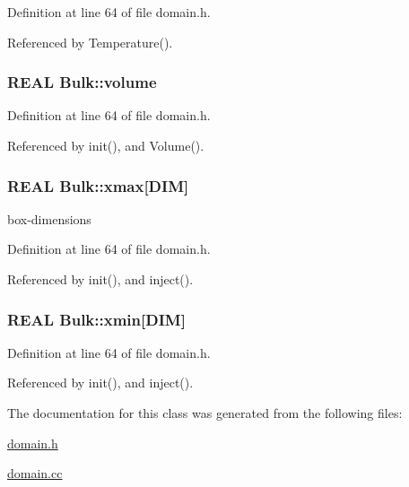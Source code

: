 Definition at line 64 of file domain.h.

Referenced by Temperature().\hypertarget{classBulk_9ffe7d1a5699e06ab7d59245f7bddcd4}{
\subsubsection[{volume}]{\setlength{\rightskip}{0pt plus 5cm}REAL {\bf Bulk::volume}}}
\label{classBulk_9ffe7d1a5699e06ab7d59245f7bddcd4}




Definition at line 64 of file domain.h.

Referenced by init(), and Volume().\hypertarget{classBulk_3297dbcf83d7c66815a5c713ebf1bfd4}{
\subsubsection[{xmax}]{\setlength{\rightskip}{0pt plus 5cm}REAL {\bf Bulk::xmax}\mbox{[}DIM\mbox{]}}}
\label{classBulk_3297dbcf83d7c66815a5c713ebf1bfd4}


box-dimensions 



Definition at line 64 of file domain.h.

Referenced by init(), and inject().\hypertarget{classBulk_5dadbb8571e0fef63e38bcc26c47637e}{
\subsubsection[{xmin}]{\setlength{\rightskip}{0pt plus 5cm}REAL {\bf Bulk::xmin}\mbox{[}DIM\mbox{]}}}
\label{classBulk_5dadbb8571e0fef63e38bcc26c47637e}




Definition at line 64 of file domain.h.

Referenced by init(), and inject().

The documentation for this class was generated from the following files:\begin{CompactItemize}
\item 
\hyperlink{domain_8h}{domain.h}\item 
\hyperlink{domain_8cc}{domain.cc}\end{CompactItemize}
